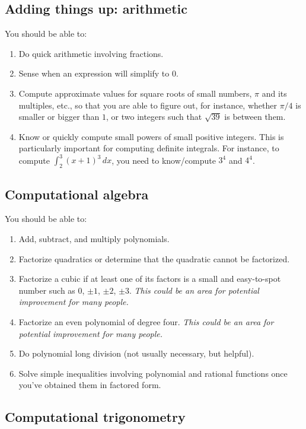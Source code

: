 \documentclass[10pt]{amsart}
\begin{document}
\subsection{Adding things up: arithmetic}

You should be able to:

\begin{enumerate}
\item Do quick arithmetic involving fractions.
\item Sense when an expression will simplify to $0$.
\item Compute approximate values for square roots of small numbers,
  $\pi$ and its multiples, etc., so that you are able to figure out,
  for instance, whether $\pi/4$ is smaller or bigger than $1$, or two
  integers such that $\sqrt{39}$ is between them.
\item Know or quickly compute small powers of small positive
  integers. This is particularly important for computing definite
  integrals. For instance, to compute $\int_2^3 (x + 1)^3 \, dx$, you
  need to know/compute $3^4$ and $4^4$.
\end{enumerate}

\subsection{Computational algebra}

You should be able to:

\begin{enumerate}
\item Add, subtract, and multiply polynomials.
\item Factorize quadratics or determine that the quadratic cannot be
  factorized.
\item Factorize a cubic if at least one of its factors is a small and
  easy-to-spot number such as $0$, $\pm 1$, $\pm 2$, $\pm 3$. {\em
  This could be an area for potential improvement for many people.}
\item Factorize an even polynomial of degree four. {\em This could be
  an area for potential improvement for many people.}
\item Do polynomial long division (not usually necessary, but helpful).
\item Solve simple inequalities involving polynomial and rational
  functions once you've obtained them in factored form.
\end{enumerate}

\subsection{Computational trigonometry}
\end{document}

